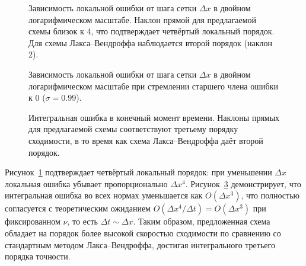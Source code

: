 \documentclass[14pt]{report}
\begin{document}
\begin{figure}[ht]
    \centering
    
    \caption{Зависимость локальной ошибки от шага сетки $\Delta x$ в двойном логарифмическом масштабе. Наклон прямой для предлагаемой схемы близок к 4, что подтверждает четвёртый локальный порядок. Для схемы Лакса–Вендроффа наблюдается второй порядок (наклон 2).}
    \label{fig:convergence-le}
\end{figure}

\begin{table}[h]
    \centering
    \label{tab:convergence-le}
    
    
    
    \caption{Сходимость различных схем в зависимости от размера сетки, локальные ошибки в масштабе $\log_2$.}
\end{table}

\begin{figure}[h]
    \centering

    

    \caption{Зависимость локальной ошибки от шага сетки $\Delta x$ в двойном логарифмическом масштабе при стремлении старшего члена ошибки к 0 ($\sigma = 0.99$).}
    \label{fig:convergence-le-diminishing-parameter}
\end{figure}

\begin{figure}[h]
\centering
    
    \caption{Интегральная ошибка в конечный момент времени. Наклоны прямых для предлагаемой схемы соответствуют третьему порядку сходимости, в то время как схема Лакса–Вендроффа даёт второй порядок.}
    \label{convergence-ge}
\end{figure}

\begin{table}[h]
    \centering
    \label{tab:convergence-ge}
    
    
    
    \caption{Сходимость различных схем в зависимости от размера сетки, интегральные ошибки в масштабе $\log_2$.}
\end{table}

Рисунок~\ref{fig:convergence-le} подтверждает четвёртый локальный порядок: при уменьшении $\Delta x$ локальная ошибка убывает пропорционально $\Delta x^4$. Рисунок~\ref{convergence-ge} демонстрирует, что интегральная ошибка во всех нормах уменьшается как $O(\Delta x^3)$, что полностью согласуется с теоретическим ожиданием $O(\Delta x^4 / \Delta t) = O(\Delta x^3)$ при фиксированном $\nu$, то есть $\Delta t \sim \Delta x$. Таким образом, предложенная схема обладает на порядок более высокой скоростью сходимости по сравнению со стандартным методом Лакса–Вендроффа, достигая интегрального третьего порядка точности.
\end{document}
